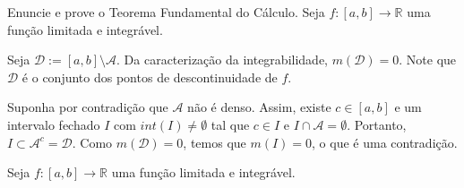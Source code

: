 \documentclass[11pt]{exam}
\begin{document}
\begin{questions}
 \question[5] Enuncie e prove o Teorema Fundamental do Cálculo.
 \question[5] Seja $f:[a,b]\rightarrow \mathbb{R}$ uma função limitada e integrável. 
  \begin{solution} Seja $\mathcal{D}:=[a,b]\setminus \mathcal{A}$. 
  Da caracterização da integrabilidade, $m(\mathcal{D})=0$. Note que 
  $\mathcal{D}$ é o conjunto dos pontos de descontinuidade de $f$.
  
  Suponha por contradição que $\mathcal{A}$ não é denso. Assim, existe $c \in [a,b]$ e um intervalo fechado $I$ com $int(I)\neq \emptyset$ 
  tal que $c \in I$ e $I\cap \mathcal{A}=\emptyset$. Portanto, $I\subset \mathcal{A}^{c}=\mathcal{D}$. Como $m(\mathcal{D})=0$, temos que 
  $m(I)=0$, o que é uma contradição.
  \end{solution}
  \question Seja $f:[a,b]\rightarrow \mathbb{R}$ uma função limitada e integrável. 
    \begin{parts}

\end{parts}
\end{questions}
\end{document}
